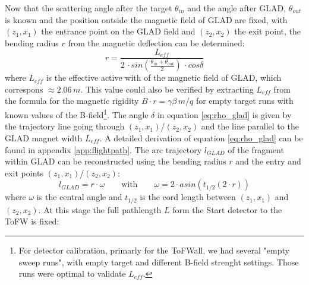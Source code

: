 Now that the scattering angle after the target $\theta_{in}$ and the angle after GLAD, $\theta_{out}$ is known and the position outside the magnetic field of GLAD are fixed, with $(z_1,x_1)$  the entrance point on the GLAD field and $(z_2,x_2)$ the exit point, the bending radius $r$ from the magnetic deflection can be determined:
\begin{equation}\label{eq:rho_glad}
r = \frac{L_{eff}}{2\,\cdot sin\left(\frac{\theta_{in}+\theta_{out}}{2}\right)\,\cdot cos\delta}
\end{equation}
where $L_{eff}$ is the effective active with of the magnetic field of GLAD, which correspons $\approx 2.06\,m$. This value could also be verified by extracting $L_{eff}$ from the formula for the magnetic rigidity $ B\cdot r = \gamma\beta \, m /q$ for empty target runs with known values of the B-field\footnote{For detector calibration, primarly for the ToFWall, we had several "empty sweep runs", with empty target and different B-field strenght settings. Those runs were optimal to validate $L_{eff}$.}.\newline
The angle $\delta$ in equation \ref{eq:rho_glad} is given by the trajectory line going through $(z_1,x_1)$/$(z_2,x_2)$ and the line parallel to the GLAD magnet width $L_{eff}$.\newline
A detailed derivation of equation \ref{eq:rho_glad} can be found in appendix \ref{app:flightpath}.
The arc trajectory $l_{GLAD}$ of the fragment within GLAD can be reconstructed using the bending radius $r$ and the entry and exit points $(z_1,x_1)$/$(z_2,x_2)$:
\begin{equation}\label{eq:arc}
l_{GLAD} = r \cdot \omega\qquad \text{with}\qquad \omega = 2\cdot asin(t_{1/2}{(2\cdot r)})
\end{equation}
where $\omega$ is the central angle and  $t_{1/2}$ is the cord length between $(z_1,x_1)$ and $(z_2,x_2)$.\newline
At this stage the full pathlength $L$ form the Start detector to the ToFW is fixed:
